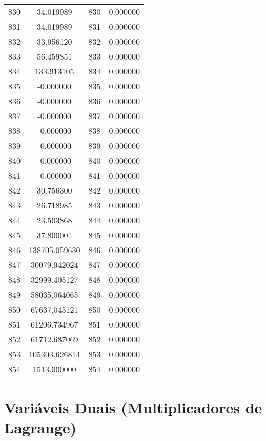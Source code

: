 \documentclass[12pt]{article}
\begin{document}
\begin{longtable}{@{}cccc@{}}
830 & 34.019989 & 830 & 0.000000 \\
831 & 34.019989 & 831 & 0.000000 \\
832 & 33.956120 & 832 & 0.000000 \\
833 & 56.459851 & 833 & 0.000000 \\
834 & 133.913105 & 834 & 0.000000 \\
835 & -0.000000 & 835 & 0.000000 \\
836 & -0.000000 & 836 & 0.000000 \\
837 & -0.000000 & 837 & 0.000000 \\
838 & -0.000000 & 838 & 0.000000 \\
839 & -0.000000 & 839 & 0.000000 \\
840 & -0.000000 & 840 & 0.000000 \\
841 & -0.000000 & 841 & 0.000000 \\
842 & 30.756300 & 842 & 0.000000 \\
843 & 26.718985 & 843 & 0.000000 \\
844 & 23.503868 & 844 & 0.000000 \\
845 & 37.800001 & 845 & 0.000000 \\
846 & 138705.059630 & 846 & 0.000000 \\
847 & 30079.942024 & 847 & 0.000000 \\
848 & 32999.405127 & 848 & 0.000000 \\
849 & 58035.064065 & 849 & 0.000000 \\
850 & 67637.045121 & 850 & 0.000000 \\
851 & 61206.734967 & 851 & 0.000000 \\
852 & 61712.687069 & 852 & 0.000000 \\
853 & 105303.626814 & 853 & 0.000000 \\
854 & 1513.000000 & 854 & 0.000000 \\

\end{longtable}

\section{Variáveis Duais (Multiplicadores de Lagrange)}
\end{document}

